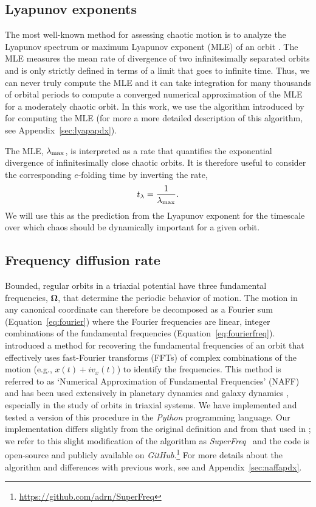 \documentclass[letterpaper,12pt,preprint]{aastex}
\newcommand{\bs}[1]{\boldsymbol{#1}}
\newcommand{\project}[1]{\textsl{#1}}
\newcommand{\superfreq}{\project{SuperFreq}}
\begin{document}
\subsection{Lyapunov exponents} \label{sec:lyap}

The most well-known method for assessing chaotic motion is to analyze the Lyapunov spectrum or maximum Lyapunov exponent (MLE) of an orbit \citep{lyapunov92}. The MLE measures the mean rate of divergence of two infinitesimally separated orbits and is only strictly defined in terms of a limit that goes to infinite time. Thus, we can never truly compute the MLE and it can take integration for many thousands of orbital periods to compute a converged numerical approximation of the MLE for a moderately chaotic orbit. In this work, we use the algorithm introduced by \cite{wolf85} for computing the MLE (for more a more detailed description of this algorithm, see Appendix~\ref{sec:lyapapdx}).

The MLE, $\lambda_{\rm max}$, is interpreted as a rate that quantifies the exponential divergence of infinitesimally close chaotic orbits. It is therefore useful to consider the corresponding $e$-folding time by inverting the rate,
\begin{equation}
	t_{\rm \lambda} = \frac{1}{\lambda_{\rm max}}.
\end{equation}
We will use this as the prediction from the Lyapunov exponent for the timescale over which chaos should be dynamically important for a given orbit.

\subsection{Frequency diffusion rate}\label{sec:naff}

Bounded, regular orbits in a triaxial potential have three fundamental frequencies, $\bs{\Omega}$, that determine the periodic behavior of motion. The motion in any canonical coordinate can therefore be decomposed as a Fourier sum (Equation~\ref{eq:fourier}) where the Fourier frequencies are linear, integer combinations of the fundamental frequencies (Equation~\ref{eq:fourierfreq}). \cite{laskar93} introduced a method for recovering the fundamental frequencies of an orbit that effectively uses fast-Fourier transforms (FFTs) of complex combinations of the motion (e.g., $x(t) + i v_x(t)$) to identify the frequencies. This method is referred to as `Numerical Approximation of Fundamental Frequencies' (NAFF) and has been used extensively in planetary dynamics \citep[e.g.,][]{laskar93b, laskar96} and galaxy dynamics \citep{papaphilippou98, valluri98}, especially in the study of orbits in triaxial systems. We have implemented and tested a version of this procedure in the \project{Python} programming language. Our implementation differs slightly from the original definition and from that used in \cite{valluri98}; we refer to this slight modification of the algorithm as \superfreq\ \citep{superfreq} and the code is open-source and publicly available on \project{GitHub}.\footnote{\url{https://github.com/adrn/SuperFreq}} For more details about the algorithm and differences with previous work, see \cite{laskar88, laskar93, papaphilippou96} and Appendix~\ref{sec:naffapdx}.
\end{document}
